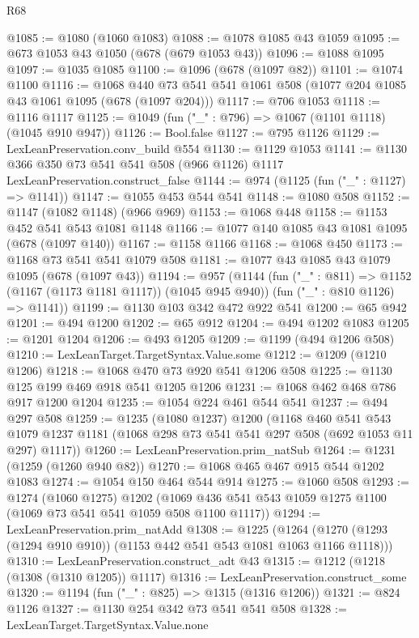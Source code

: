 \begin{lexlean}{R68}
\begin{coremodule}
@1085 := @1080 (@1060 @1083)
@1088 := @1078 @1085 @43 @1059
@1095 := @673 @1053 @43 @1050 (@678 (@679 @1053 @43))
@1096 := @1088 @1095
@1097 := @1035 @1085
@1100 := @1096 (@678 (@1097 @82))
@1101 := @1074 @1100
@1116 := @1068 @440 @73 @541 @541 @1061 @508 (@1077 @204 @1085 @43 @1061 @1095 (@678 (@1097 @204)))
@1117 := @706 @1053
@1118 := @1116 @1117
@1125 := @1049 (fun ("_" : @796) => @1067 (@1101 @1118) (@1045 @910 @947))
@1126 := Bool.false
@1127 := @795 @1126
@1129 := LexLeanPreservation.conv_build @554
@1130 := @1129 @1053
@1141 := @1130 @366 @350 @73 @541 @541 @508 (@966 @1126) @1117 LexLeanPreservation.construct_false
@1144 := @974 (@1125 (fun ("_" : @1127) => @1141))
@1147 := @1055 @453 @544 @541
@1148 := @1080 @508
@1152 := @1147 (@1082 @1148) (@966 @969)
@1153 := @1068 @448
@1158 := @1153 @452 @541 @543 @1081 @1148
@1166 := @1077 @140 @1085 @43 @1081 @1095 (@678 (@1097 @140))
@1167 := @1158 @1166
@1168 := @1068 @450
@1173 := @1168 @73 @541 @541 @1079 @508
@1181 := @1077 @43 @1085 @43 @1079 @1095 (@678 (@1097 @43))
@1194 := @957
    (@1144
      (fun ("_" : @811) => @1152 (@1167 (@1173 @1181 @1117)) (@1045 @945 @940))
      (fun ("_" : @810 @1126) => @1141))
@1199 := @1130 @103 @342 @472 @922 @541
@1200 := @65 @942
@1201 := @494 @1200
@1202 := @65 @912
@1204 := @494 @1202 @1083
@1205 := @1201 @1204
@1206 := @493 @1205
@1209 := @1199 (@494 @1206 @508)
@1210 := LexLeanTarget.TargetSyntax.Value.some
@1212 := @1209 (@1210 @1206)
@1218 := @1068 @470 @73 @920 @541 @1206 @508
@1225 := @1130 @125 @199 @469 @918 @541 @1205 @1206
@1231 := @1068 @462 @468 @786 @917 @1200 @1204
@1235 := @1054 @224 @461 @544 @541
@1237 := @494 @297 @508
@1259 := @1235
    (@1080 @1237)
    @1200
    (@1168
      @460
      @541
      @543
      @1079
      @1237
      @1181
      (@1068 @298 @73 @541 @541 @297 @508 (@692 @1053 @11 @297) @1117))
@1260 := LexLeanPreservation.prim_natSub
@1264 := @1231 (@1259 (@1260 @940 @82))
@1270 := @1068 @465 @467 @915 @544 @1202 @1083
@1274 := @1054 @150 @464 @544 @914
@1275 := @1060 @508
@1293 := @1274
    (@1060 @1275)
    @1202
    (@1069 @436 @541 @543 @1059 @1275 @1100 (@1069 @73 @541 @541 @1059 @508 @1100 @1117))
@1294 := LexLeanPreservation.prim_natAdd
@1308 := @1225
    (@1264 (@1270 (@1293 (@1294 @910 @910)) (@1153 @442 @541 @543 @1081 @1063 @1166 @1118)))
@1310 := LexLeanPreservation.construct_adt @43
@1315 := @1212 (@1218 (@1308 (@1310 @1205)) @1117)
@1316 := LexLeanPreservation.construct_some
@1320 := @1194 (fun ("_" : @825) => @1315 (@1316 @1206))
@1321 := @824 @1126
@1327 := @1130 @254 @342 @73 @541 @541 @508
@1328 := LexLeanTarget.TargetSyntax.Value.none

\end{coremodule}
\end{lexlean}
